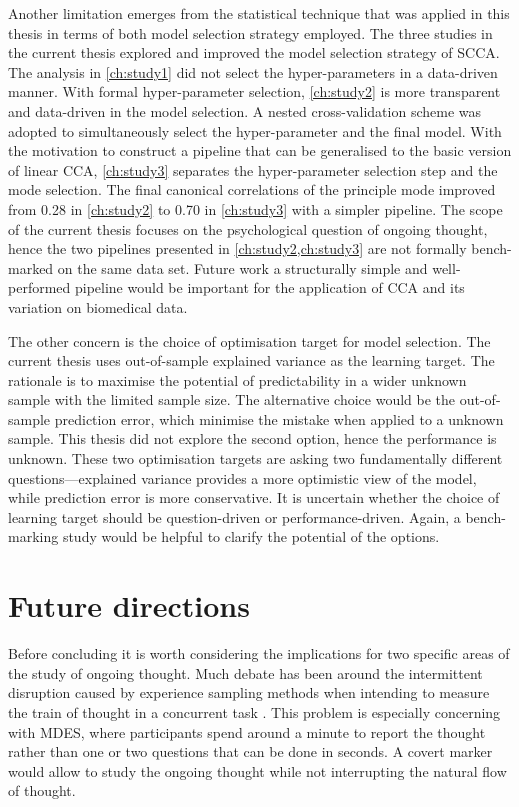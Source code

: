 Another limitation emerges from the statistical technique that was applied in this thesis in terms of both model selection strategy employed. The three studies in the current thesis explored and improved the model selection strategy of SCCA. The analysis in \cref{ch:study1} did not select the hyper-parameters in a data-driven manner. With formal hyper-parameter selection, \cref{ch:study2} is more transparent and data-driven in the model selection. A nested cross-validation scheme was adopted to simultaneously select the hyper-parameter and the final model. With the motivation to construct a pipeline that can be generalised to the basic version of linear CCA, \cref{ch:study3} separates the hyper-parameter selection step and the mode selection. The final canonical correlations of the principle mode improved from 0.28 in \cref{ch:study2} to 0.70 in \cref{ch:study3} with a simpler pipeline. The scope of the current thesis focuses on the psychological question of ongoing thought, hence the two pipelines presented in \cref{ch:study2,ch:study3} are not formally bench-marked on the same data set. Future work a structurally simple and well-performed pipeline would be important for the application of CCA and its variation on biomedical data.

The other concern is the choice of optimisation target for model selection. The current thesis uses out-of-sample explained variance as the learning target. The rationale is to maximise the potential of predictability in a wider unknown sample with the limited sample size. The alternative choice would be the out-of-sample prediction error, which minimise the mistake when applied to a unknown sample. This thesis did not explore the second option, hence the performance is unknown. These two optimisation targets are asking two fundamentally different questions---explained variance provides a more optimistic view of the model, while prediction error is more conservative. It is uncertain whether the choice of learning target should be question-driven or performance-driven. Again, a bench-marking study would be helpful to clarify the potential of the options. 



\section{Future directions}

Before concluding it is worth considering the implications for two specific areas of the study of ongoing thought. Much debate has been around the intermittent disruption caused by experience sampling methods when intending to measure the train of thought in a concurrent task \cite{SmallwoodSchooler2006}. This problem is especially concerning with MDES, where participants spend around a minute to report the thought rather than one or two questions that can be done in seconds. A covert marker would allow to study the ongoing thought while not interrupting the natural flow of thought.

